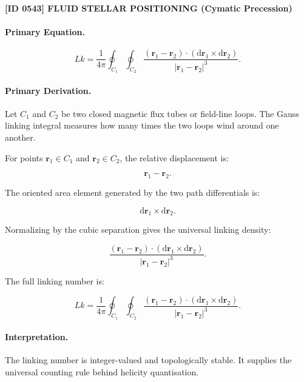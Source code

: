 \clearpage
\noindent\textbf{[ID 0543] FLUID STELLAR POSITIONING (Cymatic Precession)}\par
\vspace{0.35em}
\paragraph{Primary Equation.}
\begin{equation}
Lk
=
\frac{1}{4\pi}
\oint_{C_1}
\oint_{C_2}
\frac{
(\mathbf{r}_1-\mathbf{r}_2)
\cdot
(\mathrm{d}\mathbf{r}_1\times \mathrm{d}\mathbf{r}_2)
}{
|\mathbf{r}_1-\mathbf{r}_2|^3
}.
\end{equation}

\paragraph{Primary Derivation.}
Let $C_1$ and $C_2$ be two closed magnetic flux tubes or field-line loops.  
The Gauss linking integral measures how many times the two loops wind around one another.

For points $\mathbf{r}_1\in C_1$ and $\mathbf{r}_2\in C_2$, the relative displacement is:

\begin{equation}
\mathbf{r}_1-\mathbf{r}_2 .
\end{equation}

The oriented area element generated by the two path differentials is:

\begin{equation}
\mathrm{d}\mathbf{r}_1\times \mathrm{d}\mathbf{r}_2 .
\end{equation}

Normalizing by the cubic separation gives the universal linking density:

\begin{equation}
\frac{
(\mathbf{r}_1-\mathbf{r}_2)
\cdot
(\mathrm{d}\mathbf{r}_1\times \mathrm{d}\mathbf{r}_2)
}{
|\mathbf{r}_1-\mathbf{r}_2|^3
}.
\end{equation}

The full linking number is:

\begin{equation}
\boxed{
Lk
=
\frac{1}{4\pi}
\oint_{C_1}
\oint_{C_2}
\frac{
(\mathbf{r}_1-\mathbf{r}_2)
\cdot
(\mathrm{d}\mathbf{r}_1\times \mathrm{d}\mathbf{r}_2)
}{
|\mathbf{r}_1-\mathbf{r}_2|^3
}.
}
\end{equation}

\paragraph{Interpretation.}
The linking number is integer-valued and topologically stable. It supplies the universal counting rule behind helicity quantisation.

